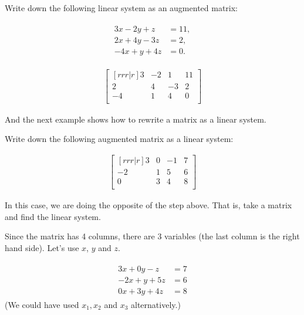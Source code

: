 \begin{example}
Write down the following linear system as an augmented matrix:


\begin{align*}
\begin{split}
3x -2 y + z & = 11, \\
2x + 4y -3z & = 2, \\
-4x + y + 4z & = 0.
\end{split}
\end{align*}

\solution

\begin{align*}
\begin{bmatrix}[rrr|r]
3 & -2 & 1 & 11 \\
2 & 4 & -3 & 2 \\
-4 & 1 & 4 & 0 \\
\end{bmatrix}
\end{align*}

\end{example}

And the next example shows how to rewrite a matrix as a linear system.

\begin{example}
Write down the following augmented matrix as a linear system:

\begin{align*}
\begin{bmatrix}[rrr|r]
3 & 0 & -1 & 7 \\
-2 & 1 & 5 & 6 \\
0 & 3 & 4 & 8 \\
\end{bmatrix}
\end{align*}

\solution

In this case, we are doing the opposite of the step above.  That is, take a matrix and find the linear system.

Since the matrix has 4 columns, there are 3 variables (the last column is the right hand side).  Let's use $x$, $y$ and $z$.

\begin{align*}
\begin{split}
3x + 0 y - z & = 7 \\
-2x + y + 5z & = 6 \\
0x + 3y + 4 z & = 8
\end{split}
\end{align*}
(We could have used $x_1,x_2$ and $x_3$ alternatively.)

\end{example}

